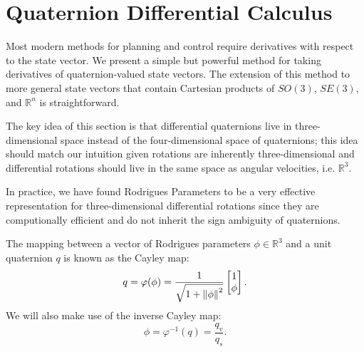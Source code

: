 \documentclass[letterpaper, 10 pt, conference]{ieeeconf}  %
\newcommand{\R}{\mathbb{R}}
\newcommand{\Q}{\mathbb{S}^3}
\begin{document}
\section{Quaternion Differential Calculus} \label{sec:Quaternion_Calculus}
    Most modern methods for planning and control require derivatives with respect to the
    state vector. We present a simple but powerful method for taking derivatives of
    quaternion-valued state vectors. The extension of this method to more general state
    vectors that contain Cartesian products of $SO(3)$, $SE(3)$, and $\mathbb{R}^n$ is
    straightforward.

    The key idea of this section is that differential quaternions live in
    three-dimensional space instead of the four-dimensional space of quaternions; this
    idea should match our intuition given rotations are inherently three-dimensional and
    differential rotations should live in the same space as angular velocities, i.e.
    $\R^3$.

    In practice, we have found Rodrigues Parameters to be a very effective representation
    for three-dimensional differential rotations since they are computionally efficient
    and do not inherit the sign ambiguity of quaternions.
    
    The mapping between a vector of Rodrigues parameters $\phi \in \R^3$ and a unit
    quaternion $q$ is known as the Cayley map:
    \begin{equation} \label{eq:cayley}
        q = \varphi(\phi) = \frac{1}{\sqrt{1 + \norm{\phi}^2}} \begin{bmatrix} 1 \\ \phi \end{bmatrix}.
    \end{equation}
    We will also make use of the inverse Cayley map:
    \begin{equation} \label{eq:invcayley}
        \phi = \varphi^{-1}(q) = \frac{q_v}{q_s}.
    \end{equation}
\end{document}
